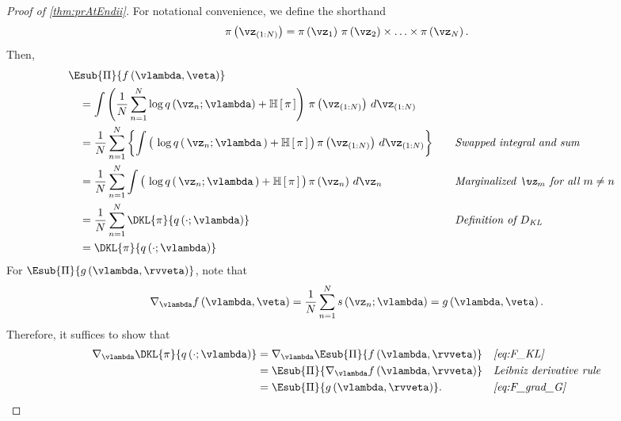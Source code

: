 
\prAtEndRestateii*
\label{proofsection:prAtEndii}\begin{proof}[Proof of \autoref{thm:prAtEndii}]\label{proof:prAtEndii}For notational convenience, we define the shorthand \begin {align*} \pi \left (\vz _{(1:N)}\right ) = \pi \left (\vz _1\right ) \, \pi \left (\vz _2\right ) \times \ldots \times \pi \left (\vz _N\right ). \end {align*} Then, \begin {alignat}{2} &\Esub {\Pi }{ f\left (\vlambda , \veta \right ) } \nonumber \\ &\quad = \int \left ( \frac {1}{N} \sum ^{N}_{n=1} \log q\left (\vz _n; \vlambda \right ) + \mathbb {H}\left [\,\pi \,\right ]\right ) \, \pi \left (\vz _{(1:N)}\right ) \, d\vz _{(1:N)} \nonumber \\ &\quad = \frac {1}{N} \sum ^{N}_{n=1} \left \{ \int \big (\, \log q\,(\,\vz _n; \vlambda \,) + \mathbb {H}\,[\,\pi \,] \,\big ) \, \pi \left (\vz _{(1:N)}\right ) \, d\vz _{(1:N)} \right \} &&\quad {\text {\textit {Swapped integral and sum}}} \nonumber \\ &\quad = \frac {1}{N} \sum ^{N}_{n=1} \int \big (\, \log q\,(\,\vz _n; \vlambda \,) + \mathbb {H}\,[\,\pi \,] \,\big ) \, \pi \left (\vz _n\right ) \, d\vz _{n} &&\quad {\text {\textit {Marginalized \(\vz _m\) for all \(m \neq n\)}}} \nonumber \\ &\quad = \frac {1}{N} \sum ^{N}_{n=1} \DKL {\pi }{q\left (\cdot ; \vlambda \right )} \nonumber &&\quad {\text {\textit {Definition of \(D_{\text {KL}}\)}}} \\ &\quad = \DKL {\pi }{q\left (\cdot ; \vlambda \right )}\label {eq:F_KL} \end {alignat} For \(\Esub {\Pi }{ g\left (\vlambda , \rvveta \right ) }\), note that \begin {align} \nabla _{\vlambda } f\left (\vlambda , \veta \right ) = \frac {1}{N} \sum ^{N}_{n=1} s\left (\vz _n; \vlambda \right ) = g\left (\vlambda , \veta \right ).\label {eq:F_grad_G} \end {align} Therefore, it suffices to show that \begin {align*} \nabla _{\vlambda } \DKL {\pi }{q\left (\cdot ; \vlambda \right )} &= \nabla _{\vlambda } \Esub {\Pi }{ f\left (\vlambda , \rvveta \right ) } &&\text {\textit {\cref {eq:F_KL}}} \\ &= \Esub {\Pi }{ \nabla _{\vlambda } f\left (\vlambda , \rvveta \right ) } &&\text {\textit {{Leibniz derivative rule}}} \\ &= \Esub {\Pi }{ g\left (\vlambda , \rvveta \right ) }. &&\text {\textit {\cref {eq:F_grad_G}}} \end {align*}\end{proof}
